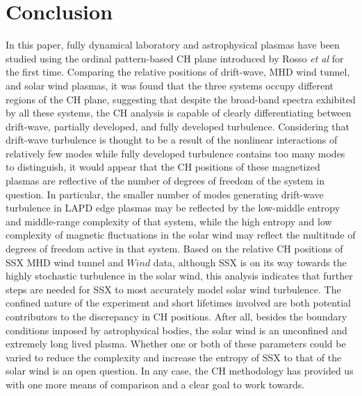 \documentclass[aps,pre,twocolumn,secnumarabic,nobalancelastpage,amsmath,amssymb,
nofootinbib]{revtex4-1}
\begin{document}
\section{Conclusion}
In this paper, fully dynamical laboratory and astrophysical plasmas have been studied using the ordinal pattern-based CH plane introduced by Rosso \textit{et al} for the first time. Comparing the relative positions of drift-wave, MHD wind tunnel, and solar wind plasmas, it was found that the three systems occupy different regions of the CH plane, suggesting that despite the broad-band spectra exhibited by all these systems, the CH analysis is capable of clearly differentiating between drift-wave, partially developed, and fully developed turbulence. Considering that drift-wave turbulence is thought to be a result of the nonlinear interactions of relatively few modes while fully developed turbulence contains too many modes to distinguish, it would appear that the CH positions of these magnetized plasmas are reflective of the number of degrees of freedom of the system in question. In particular, the smaller number of modes generating drift-wave turbulence in LAPD edge plasmas may be reflected by the low-middle entropy and middle-range complexity of that system, while the high entropy and low complexity of magnetic fluctuations in the solar wind may reflect the multitude of degrees of freedom active in that system. Based on the relative CH positions of SSX MHD wind tunnel and $\textit{Wind}$ data, although SSX is on its way towards the highly stochastic turbulence in the solar wind, this analysis indicates that further steps are needed for SSX  to most accurately model solar wind turbulence. The confined nature of the experiment and short lifetimes involved are both potential contributors to the discrepancy in CH positions. After all, besides the boundary conditions imposed by astrophysical bodies, the solar wind is an unconfined and extremely long lived plasma. Whether one or both of these parameters could be varied to reduce the complexity and increase the entropy of SSX to that of the solar wind is an open question. In any case, the CH methodology has provided us with one more means of comparison and a clear goal to work towards.





\nocite{*}
\end{document}

